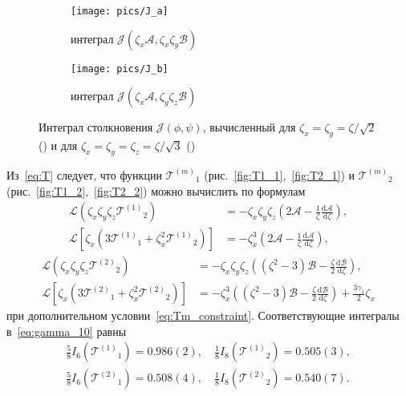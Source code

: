 \documentclass[a4paper,12pt]{article}
\newcommand{\dd}{\mathrm{d}}
\newcommand{\der}[2][]{\frac{\dd#1}{\dd#2}}
\newcommand{\T}[1]{\ensuremath{\mathcal{T}^{(#1)}}}
\begin{document}
\begin{figure}
    \centering
    \begin{subfigure}[b]{.5\linewidth}
        \centering
        \texttt{[image: pics/J\_a]}
    	\caption{интеграл \(\mathcal{J}\left( \zeta_x\mathcal{A}, \zeta_x\zeta_y\mathcal{B} \right)\)}\label{fig:J_a}
    \end{subfigure}%
    \begin{subfigure}[b]{.5\linewidth}
        \centering
        \texttt{[image: pics/J\_b]}
    	\caption{интеграл \(\mathcal{J}\left( \zeta_x\mathcal{A}, \zeta_y\zeta_z\mathcal{B} \right)\)}\label{fig:J_b}
    \end{subfigure}
    \caption{Интеграл столкновения \(\mathcal{J}(\phi,\psi)\),
        вычисленный для \(\zeta_x=\zeta_y=\zeta/\sqrt2\) ()
        и для \(\zeta_x=\zeta_y=\zeta_z=\zeta/\sqrt3\) () }
    \label{fig:J_allT}
\end{figure}


Из~\eqref{eq:T} следует, что функции \(\T{m}_1\) (рис.~\ref{fig:T1_1},~\ref{fig:T2_1})
и \(\T{m}_2\) (рис.~\ref{fig:T1_2},~\ref{fig:T2_2}) можно вычислить по формулам
\begin{align}
    \mathcal{L}\left( \zeta_x\zeta_y\zeta_z\T{1}_2 \right)
        &= -\zeta_x\zeta_y\zeta_z\left(2\mathcal{A} - \frac1\zeta\der[\mathcal{A}]{\zeta}\right), \label{eq:T2a}\\
    \mathcal{L}\left[ \zeta_x\left(3\T{1}_1 + \zeta_x^2\T{1}_2\right) \right]
        &= -\zeta_x^3\left(2\mathcal{A} - \frac1\zeta\der[\mathcal{A}]{\zeta}\right), \label{eq:T1a}
\end{align}
\begin{align}
    \mathcal{L}\left( \zeta_x\zeta_y\zeta_z\T{2}_2 \right)
        &= -\zeta_x\zeta_y\zeta_z\left((\zeta^2-3)\mathcal{B} - \frac\zeta2\der[\mathcal{B}]{\zeta}\right), \label{eq:T2b}\\
    \mathcal{L}\left[ \zeta_x\left(3\T{2}_1 + \zeta_x^2\T{2}_2\right) \right]
        &= -\zeta_x^3\left((\zeta^2-3)\mathcal{B} - \frac\zeta2\der[\mathcal{B}]{\zeta}\right) + \frac{3\gamma_1}{2}\zeta_x \label{eq:T1b}
\end{align}
при дополнительном условии~\eqref{eq:Tm_constraint}.
Соответствующие интегралы в~\eqref{eq:gamma_10} равны
\begin{gather}
    \frac58 I_6\left(\T{1}_1\right) = 0.986(2), \quad \frac18 I_8\left(\T{1}_2\right) = 0.505(3), \label{eq:gamma10a}\\
    \frac58 I_6\left(\T{2}_1\right) = 0.508(4), \quad \frac18 I_8\left(\T{2}_2\right) = 0.540(7). \label{eq:gamma10b}
\end{gather}
\end{document}
